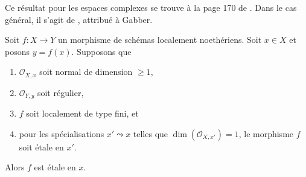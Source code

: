 \begin{lemma}
\label{lemma-purity-ramification}
\begin{reference}
Ce résultat pour les espaces complexes se trouve à la page 170 de \cite{Fischer}.
Dans le cas général, il s'agit de \cite[Theorem 2.4]{Zong}, attribué à Gabber.
\end{reference}
Soit $f : X \to Y$ un morphisme de schémas localement noethériens.
Soit $x \in X$ et posons $y = f(x)$. Supposons que
\begin{enumerate}
\item $\mathcal{O}_{X, x}$ soit normal de dimension $\geq 1$,
\item $\mathcal{O}_{Y, y}$ soit régulier,
\item $f$ soit localement de type fini, et
\item pour les spécialisations $x' \leadsto x$ telles que
$\dim(\mathcal{O}_{X, x'}) = 1$, le morphisme $f$ soit \'etale en $x'$.
\end{enumerate}
Alors $f$ est \'etale en $x$.
\end{lemma}

